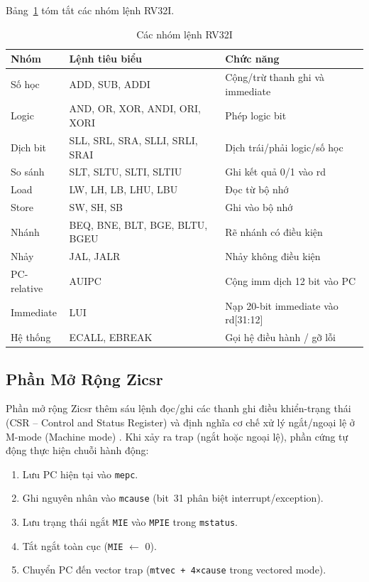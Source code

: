 Bảng~\ref{tab:instr-groups} tóm tắt các nhóm lệnh RV32I.

\begin{table}[htbp]
\caption{Các nhóm lệnh RV32I}
\label{tab:instr-groups}
\begin{center}
\begin{tabular}{|l|l|l|}
\hline
\textbf{Nhóm} & \textbf{Lệnh tiêu biểu} & \textbf{Chức năng} \\ \hline
Số học & ADD, SUB, ADDI & Cộng/trừ thanh ghi và immediate \\ \hline
Logic & AND, OR, XOR, ANDI, ORI, XORI & Phép logic bit \\ \hline
Dịch bit & SLL, SRL, SRA, SLLI, SRLI, SRAI & Dịch trái/phải logic/số học \\ \hline
So sánh & SLT, SLTU, SLTI, SLTIU & Ghi kết quả 0/1 vào rd \\ \hline
Load & LW, LH, LB, LHU, LBU & Đọc từ bộ nhớ \\ \hline
Store & SW, SH, SB & Ghi vào bộ nhớ \\ \hline
Nhánh & BEQ, BNE, BLT, BGE, BLTU, BGEU & Rẽ nhánh có điều kiện \\ \hline
Nhảy & JAL, JALR & Nhảy không điều kiện \\ \hline
PC-relative & AUIPC & Cộng imm dịch 12 bit vào PC \\ \hline
Immediate & LUI & Nạp 20-bit immediate vào rd[31:12] \\ \hline
Hệ thống & ECALL, EBREAK & Gọi hệ điều hành / gỡ lỗi \\ \hline
\end{tabular}
\end{center}
\end{table}

\subsection{Phần Mở Rộng Zicsr}

Phần mở rộng Zicsr thêm sáu lệnh đọc/ghi các thanh ghi điều khiển-trạng thái (CSR -- Control and Status Register) và định nghĩa cơ chế xử lý ngắt/ngoại lệ ở M-mode (Machine mode) \cite{riscv-priv-spec}. Khi xảy ra trap (ngắt hoặc ngoại lệ), phần cứng tự động thực hiện chuỗi hành động:

\begin{enumerate}
    \item Lưu PC hiện tại vào \texttt{mepc}.
    \item Ghi nguyên nhân vào \texttt{mcause} (bit~31 phân biệt interrupt/exception).
    \item Lưu trạng thái ngắt \texttt{MIE} vào \texttt{MPIE} trong \texttt{mstatus}.
    \item Tắt ngắt toàn cục (\texttt{MIE} $\leftarrow$ 0).
    \item Chuyển PC đến vector trap (\texttt{mtvec + 4×cause} trong vectored mode).
\end{enumerate}

